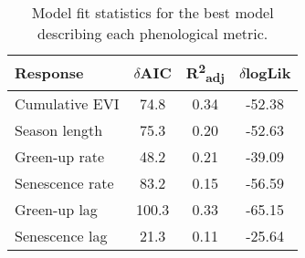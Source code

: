 \begin{table}
\caption[Model fit statistics]{Model fit statistics for the best model describing each phenological metric.} 
\label{phen:mod_stat}
\begin{tabular}{lS[table-format=3.1]S[table-format=1.2]S[table-format=-2.2]}
  \toprule
  {Response} & {$\delta$AIC} & {R\textsuperscript{2}\textsubscript{adj}} & {$\delta$logLik} \\ 
  \midrule
Cumulative EVI & 74.8 & 0.34 & -52.38 \\ 
  Season length & 75.3 & 0.20 & -52.63 \\ 
  Green-up rate & 48.2 & 0.21 & -39.09 \\ 
  Senescence rate & 83.2 & 0.15 & -56.59 \\ 
  Green-up lag & 100.3 & 0.33 & -65.15 \\ 
  Senescence lag & 21.3 & 0.11 & -25.64 \\ 
   \bottomrule
\end{tabular}
\end{table}

